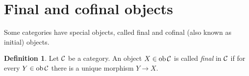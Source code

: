 \documentclass[11pt]{amsbook}
\DeclareMathOperator\ob{ob}
\def\Set{\mathbf{Set}}
\def\Grp{\mathbf{Grp}}
\theoremstyle{plain}
\theoremstyle{definition}
\newtheorem{definition}[theorem]{Definition}
\newtheorem{example}[theorem]{Example}
\begin{document}
%
%
%
%


\section{Final and cofinal objects}

Some categories have special objects, called final and cofinal (also known as initial) objects. 

\begin{definition}
Let ${\mathcal{C}}$ be a category. An object $X\in \ob \cC$ is called \emph{final} in ${\mathcal{C}}$ if for every $Y\in \ob\cC$ there is a 
unique morphism $Y \to X$.
\end{definition}
\end{document}
